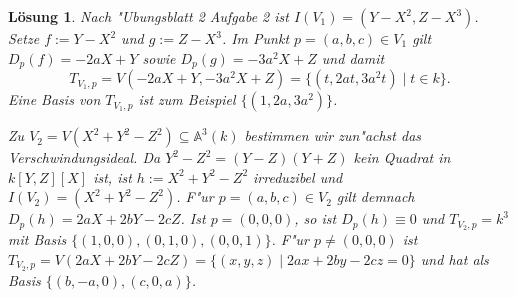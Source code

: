 \documentclass[a4paper, 12pt, numbers=noendperiod, chapterprefix=true]{scrbook}
\theoremstyle{break}
\newtheorem{Loes}{L\"osung}
\theoremstyle{nonumberbreak}
\theoremstyle{nonumberplain}
\newcommand{\A}{\mathbb{A}}
\newcommand{\Affine}{\mathbb{A}} %
\begin{document}
\begin{Loes}
Nach "Ubungsblatt 2 Aufgabe 2 ist $I(V_1) = (Y-X^2,Z-X^3)$. Setze $f := Y-X^2$ und $g := Z - X^3$. Im Punkt $p=(a,b,c) \in V_1$ gilt $D_p(f) = -2aX+Y$ sowie $D_p(g) = -3a^2X+Z$ und damit
 \[T_{V_1,p} = V(-2aX+Y,-3a^2X+Z) = \{(t,2at,3a^2t) \mid t \in k\}.\]
Eine Basis von $T_{V_1,p}$ ist zum Beispiel $\{(1, 2a,3a^2)\}$.

Zu $V_2 = V(X^2+Y^2-Z^2) \subseteq \Affine^3(k)$ bestimmen wir zun"achst das Verschwindungsideal. Da $Y^2-Z^2 = (Y-Z)(Y+Z)$ kein Quadrat in $k[Y,Z][X]$ ist, ist $h := X^2+Y^2-Z^2$ irreduzibel und $I(V_2) =(X^2+Y^2-Z^2)$. F"ur $p=(a,b,c) \in V_2$ gilt demnach $D_p(h) = 2aX+2bY-2cZ$. Ist $p=(0,0,0)$, so ist $D_p(h) \equiv 0$ und $T_{V_2,p} = k^3$ mit Basis $\{(1,0,0), (0,1,0),(0,0,1)\}$. F"ur $p \neq (0,0,0)$ ist $T_{V_2,p} = V(2aX+2bY-2cZ) = \{(x,y,z) \mid 2ax+2by-2cz = 0\}$ und hat als Basis $\{(b,-a,0),(c,0,a)\}$.
\end{Loes}
\end{document}
